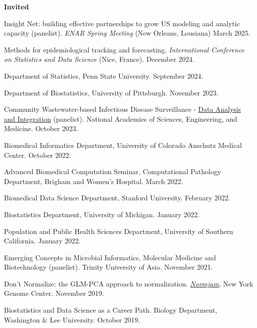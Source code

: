 \documentclass[10pt]{article}
\renewcommand{\section}[2]%
        {\pagebreak[2]\vspace{1.3\baselineskip}%
         \phantomsection\addcontentsline{toc}{section}{#1}%
         \hspace{0in}%
         \marginpar{
         \raggedright \scshape #1}#2}
\begin{document}
\section{Talks}
\textbf{Invited}
\begin{enumerate}[label= {[\arabic*]}]
\item Insight Net: building effective partnerships to grow US modeling and analytic capacity (panelist). {\it ENAR Spring Meeting} (New Orleans, Lousiana) March 2025.
\item Methods for epidemiological tracking and forecasting. {\it International Conference on Statistics and Data Science} (Nice, France). December 2024. 
\item Department of Statistics, Penn State University. September 2024.
\item Department of Biostatistics, University of Pittsburgh. November 2023.
\item Community Wastewater-based Infectious Disease Surveillance - \href{https://www.nationalacademies.org/event/40901_10-2023_community-wastewater-based-infectious-disease-surveillance-data-analysis-and-integration-open-subgroup-meeting-1}{Data Analysis and Integration} (panelist). National Academies of Sciences, Engineering, and Medicine. October 2023.
\item Biomedical Informatics Department, University of Colorado Anschutz Medical Center. October 2022.
\item Advanced Biomedical Computation Seminar, Computational Pathology Department, Brigham and Women's Hospital. March 2022.
\item Biomedical Data Science Department, Stanford University. February 2022.
\item Biostatistics Department, University of Michigan. January 2022.
\item Population and Public Health Sciences Department, University of Southern California. January 2022.
\item Emerging Concepts in Microbial Informatics, Molecular Medicine and Biotechnology (panelist). Trinity University of Asia. November 2021.
\item Don't Normalize: the GLM-PCA approach to normalization. \href{https://normjam.github.io/}{{\it Normjam}}, New York Genome Center. November 2019.
\item Biostatistics and Data Science as a Career Path. Biology Department, Washington \& Lee University. October 2019.
\end{enumerate}
\end{document}
